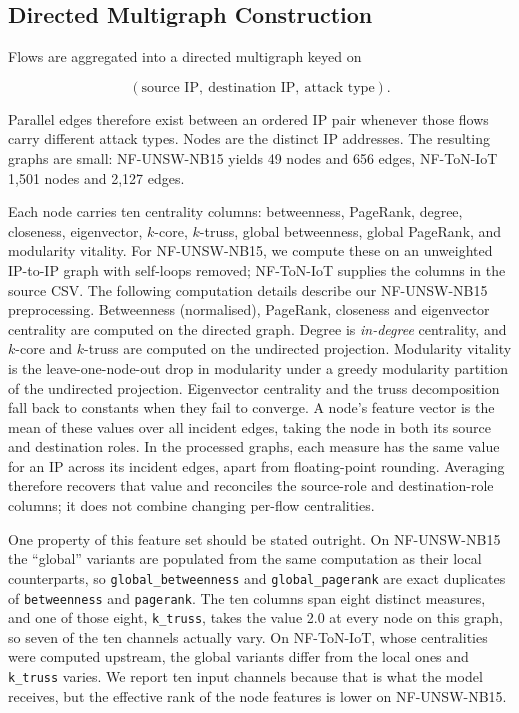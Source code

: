 \subsection{Directed Multigraph Construction}
\label{sec:method-graph}

Flows are aggregated into a directed multigraph keyed on

\begin{equation}
\label{eq:aggregation-key}
(\text{source IP},\ \text{destination IP},\ \text{attack type}).
\end{equation}

Parallel edges therefore exist between an ordered IP pair whenever those flows carry
different attack types. Nodes are the distinct IP addresses. The resulting graphs are small:
NF-UNSW-NB15 yields 49 nodes and 656 edges, NF-ToN-IoT 1{,}501 nodes and 2{,}127 edges.

Each node carries ten centrality columns: betweenness, PageRank, degree, closeness,
eigenvector, $k$-core, $k$-truss, global betweenness, global PageRank, and modularity
vitality. For NF-UNSW-NB15, we compute these on an unweighted IP-to-IP graph with self-loops removed; NF-ToN-IoT supplies the columns in the source CSV. The following computation details describe our NF-UNSW-NB15 preprocessing.
Betweenness (normalised), PageRank, closeness and eigenvector centrality are computed on the
directed graph. Degree is \emph{in-degree} centrality, and $k$-core and $k$-truss are computed on
the undirected projection. Modularity vitality is the leave-one-node-out drop in modularity
under a greedy modularity partition of the undirected projection. Eigenvector centrality and
the truss decomposition fall back to constants when they fail to converge. A node's feature
vector is the mean of these values over all incident edges, taking the node in both its
source and destination roles. In the processed graphs, each measure has the same value for an IP across its incident edges, apart from floating-point rounding. Averaging therefore recovers that value and reconciles the source-role and destination-role columns; it does not combine changing per-flow centralities.

One property of this feature set should be stated outright.
On NF-UNSW-NB15 the ``global'' variants are populated from the same computation as their
local counterparts, so \texttt{global\_betweenness} and \texttt{global\_pagerank} are exact
duplicates of \texttt{betweenness} and \texttt{pagerank}. The ten columns span eight distinct
measures, and one of those eight, \texttt{k\_truss}, takes the value 2.0 at every node on this
graph, so seven of the ten channels actually vary. On NF-ToN-IoT, whose centralities were
computed upstream, the global variants differ from the local ones and \texttt{k\_truss} varies.
We report ten input channels because that is what the model receives, but the effective rank
of the node features is lower on NF-UNSW-NB15.

